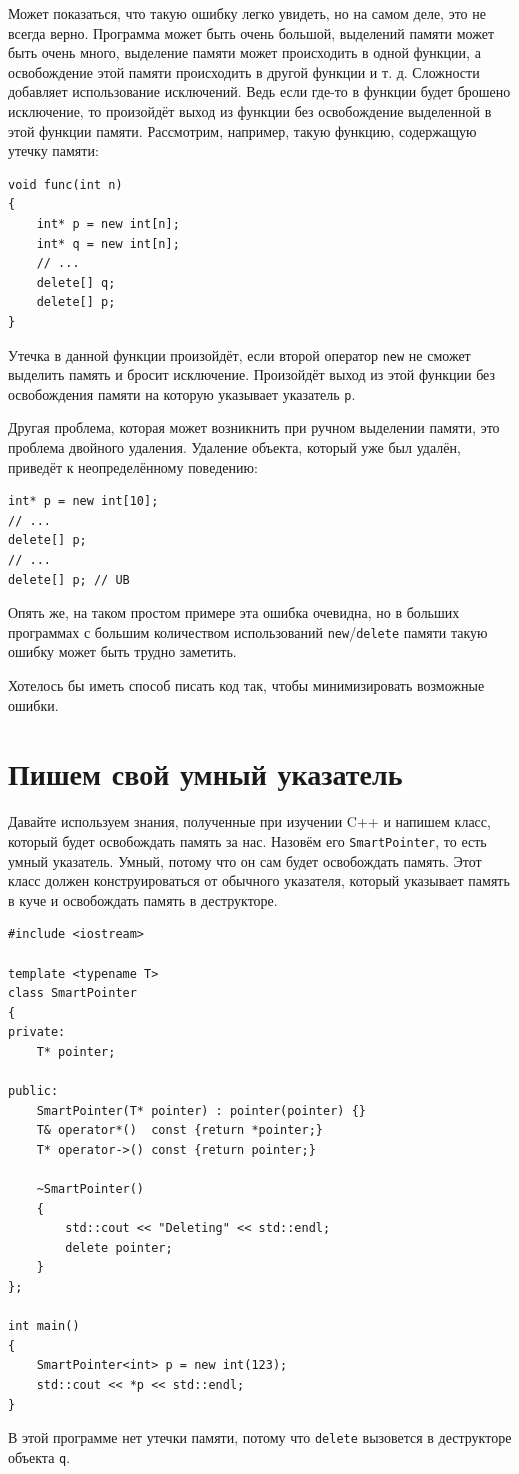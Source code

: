 \documentclass{article}
\begin{document}
Может показаться, что такую ошибку легко увидеть, но на самом деле, это не всегда верно. Программа может быть очень большой, выделений памяти может быть очень много, выделение памяти может происходить в одной функции, а освобождение этой памяти происходить в другой функции и т. д. 
Сложности добавляет использование исключений. Ведь если где-то в функции будет брошено исключение, то произойдёт выход из функции без освобождение выделенной в этой функции памяти. Рассмотрим, например, такую функцию, содержащую утечку памяти:
\begin{lstlisting}
void func(int n) 
{
    int* p = new int[n];
    int* q = new int[n];
	// ...		
    delete[] q;
    delete[] p;
}
\end{lstlisting}
Утечка в данной функции произойдёт, если второй оператор \texttt{new} не сможет выделить память и бросит исключение. Произойдёт выход из этой функции без освобождения памяти на которую указывает указатель \texttt{p}.

Другая проблема, которая может возникнить при ручном выделении памяти, это проблема двойного удаления. Удаление объекта, который уже был удалён, приведёт к неопределённому поведению:
\begin{lstlisting}
int* p = new int[10];
// ...
delete[] p;
// ...
delete[] p; // UB
\end{lstlisting}
Опять же, на таком простом примере эта ошибка очевидна, но в больших программах с большим количеством
использований \texttt{new}/\texttt{delete} памяти такую ошибку может быть трудно заметить.

Хотелось бы иметь способ писать код так, чтобы минимизировать возможные ошибки.



\newpage
\section*{Пишем свой умный указатель}
Давайте используем знания, полученные при изучении C++ и напишем класс, который будет освобождать память за нас. Назовём его \texttt{SmartPointer}, то есть умный указатель. Умный, потому что он сам будет освобождать память. Этот класс должен конструироваться от обычного указателя, который указывает память в куче и освобождать память в деструкторе.
\begin{lstlisting}
#include <iostream>

template <typename T>
class SmartPointer
{
private:
    T* pointer;

public:
    SmartPointer(T* pointer) : pointer(pointer) {}
    T& operator*()  const {return *pointer;}
    T* operator->() const {return pointer;}

    ~SmartPointer() 
    {
        std::cout << "Deleting" << std::endl;
        delete pointer;
    }
};

int main()
{
    SmartPointer<int> p = new int(123);
    std::cout << *p << std::endl;
} 
\end{lstlisting}
В этой программе нет утечки памяти, потому что \texttt{delete} вызовется в деструкторе объекта \texttt{q}. 
\end{document}
